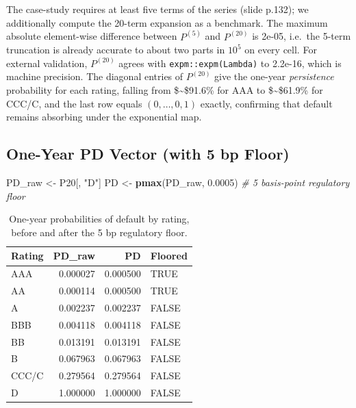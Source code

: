 \documentclass[
  11pt,
]{article}
\newenvironment{Shaded}{\begin{snugshade}}{\end{snugshade}}
\newcommand{\CommentTok}[1]{\textcolor[rgb]{0.56,0.35,0.01}{\textit{#1}}}
\newcommand{\FloatTok}[1]{\textcolor[rgb]{0.00,0.00,0.81}{#1}}
\newcommand{\FunctionTok}[1]{\textcolor[rgb]{0.13,0.29,0.53}{\textbf{#1}}}
\newcommand{\NormalTok}[1]{#1}
\newcommand{\OtherTok}[1]{\textcolor[rgb]{0.56,0.35,0.01}{#1}}
\newcommand{\StringTok}[1]{\textcolor[rgb]{0.31,0.60,0.02}{#1}}
\begin{document}
The case-study requires at least five terms of the series (slide p.132);
we additionally compute the 20-term expansion as a benchmark. The
maximum absolute element-wise difference between \(P^{(5)}\) and
\(P^{(20)}\) is 2e-05, i.e.~the 5-term truncation is already accurate to
about two parts in \(10^5\) on every cell. For external validation,
\(P^{(20)}\) agrees with \texttt{expm::expm(Lambda)} to 2.2e-16, which
is machine precision. The diagonal entries of \(P^{(20)}\) give the
one-year \emph{persistence} probability for each rating, falling from
\$\sim\$91.6\% for AAA to \$\sim\$61.9\% for CCC/C, and the last row
equals \((0, \dots, 0, 1)\) exactly, confirming that default remains
absorbing under the exponential map.

\subsection{One-Year PD Vector (with 5 bp
Floor)}\label{one-year-pd-vector-with-5-bp-floor}

\begin{Shaded}
\begin{Highlighting}[]
\NormalTok{PD\_raw }\OtherTok{\textless{}{-}}\NormalTok{ P20[, }\StringTok{"D"}\NormalTok{]}
\NormalTok{PD     }\OtherTok{\textless{}{-}} \FunctionTok{pmax}\NormalTok{(PD\_raw, }\FloatTok{0.0005}\NormalTok{)   }\CommentTok{\# 5 basis{-}point regulatory floor}
\end{Highlighting}
\end{Shaded}

\begin{longtable}[t]{lrrl}
\caption{\label{tab:task1-PD-table}One-year probabilities of default by rating, before and after the 5 bp regulatory floor.}\\
\toprule
Rating & PD\_raw & PD & Floored\\
\midrule
AAA & 0.000027 & 0.000500 & TRUE\\
AA & 0.000114 & 0.000500 & TRUE\\
A & 0.002237 & 0.002237 & FALSE\\
BBB & 0.004118 & 0.004118 & FALSE\\
BB & 0.013191 & 0.013191 & FALSE\\
\addlinespace
B & 0.067963 & 0.067963 & FALSE\\
CCC/C & 0.279564 & 0.279564 & FALSE\\
D & 1.000000 & 1.000000 & FALSE\\
\bottomrule
\end{longtable}
\end{document}
